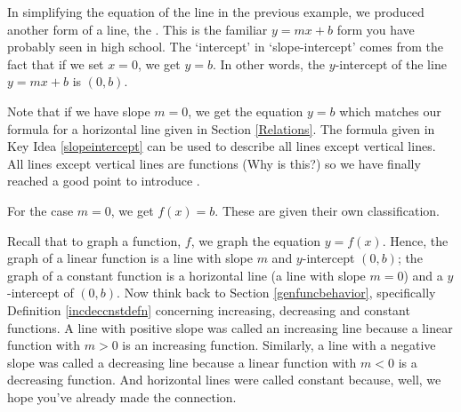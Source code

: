 \medskip

In simplifying the equation of the line in the previous example, we produced another form of a line, the .  This is the familiar $y = mx + b$ form you have probably seen in high school. The `intercept' in `slope-intercept' comes from the fact that if we set $x=0$, we get $y = b$.  In other words, the $y$-intercept of the line $y = mx + b$ is $(0,b)$.

\smallskip


\smallskip

Note that if we have slope $m = 0$, we get the equation $y = b$ which matches our formula for a horizontal line given in Section \ref{Relations}.  The formula given in Key Idea \ref{slopeintercept} can be used to describe all lines except vertical lines.  All lines except vertical lines are functions (Why is this?) so we have finally reached a good point to introduce .

\smallskip


\smallskip

For the case $m=0$, we get $f(x) = b$.  These are given their own classification.

\smallskip


\smallskip

Recall that to graph a function, $f$, we graph the equation $y=f(x)$. Hence, the graph of a linear function is a line with slope $m$ and $y$-intercept $(0,b)$; the graph of a constant function is a horizontal line (a line with slope $m = 0$) and a $y$-intercept of $(0,b)$.  Now think back to Section \ref{genfuncbehavior}, specifically Definition \ref{incdeccnstdefn} concerning increasing, decreasing and constant functions.  A line with positive slope was called an increasing line because a linear function with $m > 0$ is an increasing function.  Similarly, a line with a negative slope was called a decreasing line because a linear function with $m < 0$ is a decreasing function.  And horizontal lines were called constant because, well, we hope you've already made the connection.  

